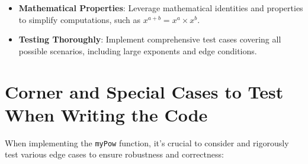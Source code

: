 \begin{itemize}
    \item \textbf{Mathematical Properties}: Leverage mathematical identities and properties to simplify computations, such as \(x^{a+b} = x^a \times x^b\).
    
    \item \textbf{Testing Thoroughly}: Implement comprehensive test cases covering all possible scenarios, including large exponents and edge conditions.
\end{itemize}

\section*{Corner and Special Cases to Test When Writing the Code}

When implementing the \texttt{myPow} function, it's crucial to consider and rigorously test various edge cases to ensure robustness and correctness:

